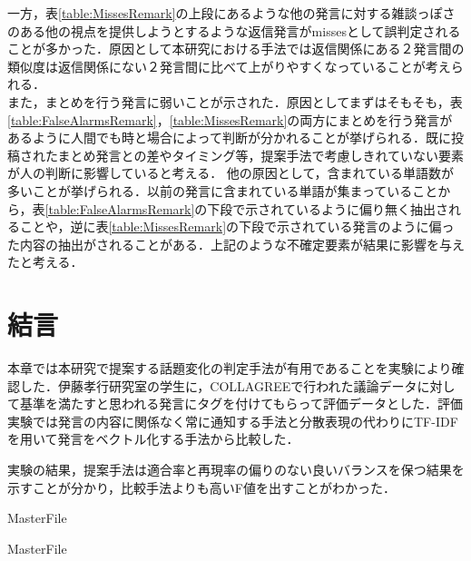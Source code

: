 一方，表\ref{table:MissesRemark}の上段にあるような他の発言に対する雑談っぽさのある他の視点を提供しようとするような返信発言がmissesとして誤判定されることが多かった．原因として本研究における手法では返信関係にある２発言間の類似度は返信関係にない２発言間に比べて上がりやすくなっていることが考えられる．
\\
また，まとめを行う発言に弱いことが示された．原因としてまずはそもそも，表\ref{table:FalseAlarmsRemark}，\ref{table:MissesRemark}の両方にまとめを行う発言があるように人間でも時と場合によって判断が分かれることが挙げられる．既に投稿されたまとめ発言との差やタイミング等，提案手法で考慮しきれていない要素が人の判断に影響していると考える．
他の原因として，含まれている単語数が多いことが挙げられる．以前の発言に含まれている単語が集まっていることから，表\ref{table:FalseAlarmsRemark}の下段で示されているように偏り無く抽出されることや，逆に表\ref{table:MissesRemark}の下段で示されている発言のように偏った内容の抽出がされることがある．上記のような不確定要素が結果に影響を与えたと考える．

\section{結言}
\label{exp:conclusion}
本章では本研究で提案する話題変化の判定手法が有用であることを実験により確認した．伊藤孝行研究室の学生に，COLLAGREEで行われた議論データに対して基準を満たすと思われる発言にタグを付けてもらって評価データとした．評価実験では発言の内容に関係なく常に通知する手法と分散表現の代わりにTF-IDFを用いて発言をベクトル化する手法から比較した．

実験の結果，提案手法は適合率と再現率の偏りのない良いバランスを保つ結果を示すことが分かり，比較手法よりも高いF値を出すことがわかった．

 \expandafter\ifx\csname MasterFile\endcsname\relax
	\def\BibFile{hoge}
	
  \fi
  \expandafter\ifx\csname MasterFile\endcsname\relax

\fi
